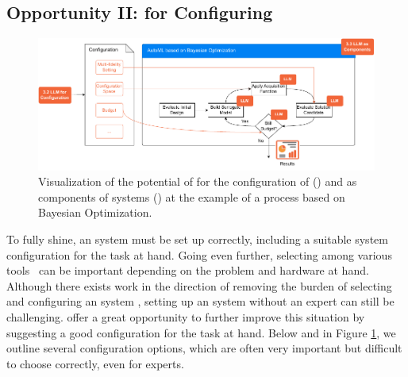 \subsection{Opportunity II: \LLMs for Configuring \AutoML}
\label{llm-ssec:llms-for-configuring-automl}


\begin{figure}
    \centering
    \includegraphics[width=1.\textwidth]{chapters/human-centric/llm/img/llms_for_automl_configuration.pdf}
    \caption{Visualization of the potential of \LLMs for the configuration of \AutoML () and \LLMs as components of \AutoML systems () at the example of a \AutoML process based on Bayesian Optimization.}
    \label{llm-fig:llms_for_automl_configuration}
\end{figure}

To fully shine, an \AutoML system must be set up correctly, including a suitable system configuration for the task at hand. Going even further, selecting among various \AutoML tools~\cite{thornton-kdd13a, feurer-nips15a, akiba-kdd19a, jin-sigkdd19a, erickson-arxiv20a, zimmer-tpami21a} can be important depending on the problem and hardware at hand. Although there exists work in the direction of removing the burden of selecting and configuring an \AutoML system \cite{feurer-automl18b,tornede-mlj22a,feurer-jmlr22a,moosbauer-tec22a}, setting up an \AutoML system without an expert can still be challenging. \LLMs offer a great opportunity to further improve this situation by suggesting a good configuration for the task at hand. Below and in Figure \ref{llm-fig:llms_for_automl_configuration}, we outline several configuration options, which are often very important but difficult to choose correctly, even for experts. 

